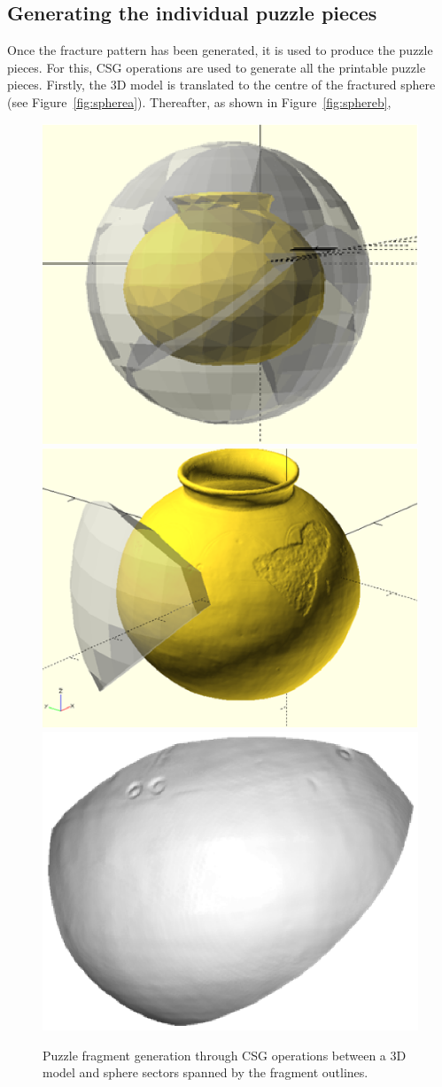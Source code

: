 \documentclass[acmlarge,screen,dvipsnames]{acmart}
\begin{document}


\subsection{Generating the individual puzzle pieces}
\label{sec:fragment-generation}

Once the fracture pattern has been generated, it is used to produce
the puzzle pieces. For this, CSG operations are used to generate all
the printable puzzle pieces. Firstly, the 3D model is translated to
the centre of the fractured sphere (see
Figure~\ref{fig:spherea}). Thereafter, as shown in
Figure~\ref{fig:sphereb},
%
\begin{figure}[b]
  \centering%
  \vspace*{-0.5\baselineskip}
  {\includegraphics[width=0.30\linewidth]{images/sphere}}
  \hspace{0.2in}
   {\includegraphics[width=0.30\linewidth]{images/intersection}}
   \hspace{0.2in}
  {\includegraphics[width=0.30\linewidth]{images/puzzlepiece}}
  \caption{Puzzle fragment generation through CSG operations between a 3D model and
    sphere sectors spanned by the fragment outlines.\vspace*{-1.0\baselineskip}}
\end{figure}
\end{document}
